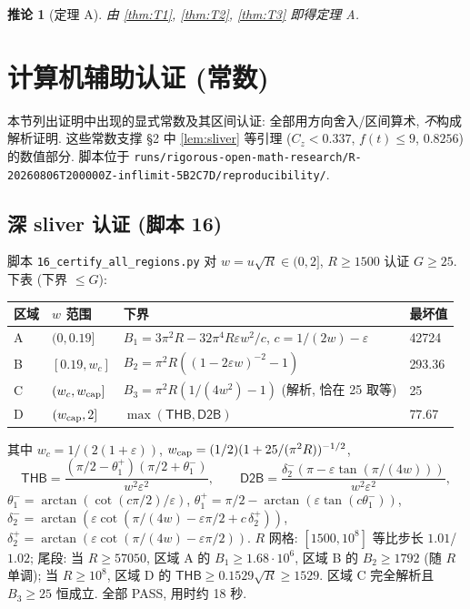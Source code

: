 \documentclass[UTF8]{ctexart}
\newtheorem{corollary}[theorem]{推论}
\begin{document}
\begin{corollary}[定理 A]
由 \ref{thm:T1}, \ref{thm:T2}, \ref{thm:T3} 即得定理 A.
\end{corollary}

\section{计算机辅助认证 (常数)}\label{sec:cac}

本节列出证明中出现的显式常数及其区间认证: 全部用方向舍入/区间算术,
\emph{不}构成解析证明. 这些常数支撑 §2 中 \ref{lem:sliver} 等引理
($C_z<0.337$, $f(t)\le9$, $0.8256$) 的数值部分.
脚本位于 \texttt{runs/rigorous-open-math-research/R-20260806T200000Z-inflimit-5B2C7D/reproducibility/}.

\subsection{深 sliver 认证 (脚本 16)}\label{sec:ca-sliver}
脚本 \texttt{16\_certify\_all\_regions.py} 对 $w=u\sqrt R\in(0,2]$, $R\ge1500$ 认证
$G\ge25$. 下表 (下界 $\le G$):
\begin{center}
\small
\begin{tabular}{@{}llll@{}}
\toprule
区域 & $w$ 范围 & 下界 & 最坏值 \\
\midrule
A & $(0,0.19]$ & $B_1=3\pi^2R-32\pi^4R\varepsilon w^2/c$, $c=1/(2w)-\varepsilon$ & 42724 \\
B & $[0.19,w_c]$ & $B_2=\pi^2R((1-2\varepsilon w)^{-2}-1)$ & 293.36 \\
C & $(w_c,w_{\rm cap}]$ & $B_3=\pi^2R(1/(4w^2)-1)$ (解析, 恰在 25 取等) & 25 \\
D & $(w_{\rm cap},2]$ & $\max(\mathsf{THB},\mathsf{D2B})$ & 77.67 \\
\bottomrule
\end{tabular}
\end{center}
其中 $w_c=1/(2(1+\varepsilon))$, $w_{\rm cap}=(1/2)(1+25/(\pi^2R))^{-1/2}$,
\begin{equation}
	\mathsf{THB}=\frac{(\pi/2-\theta_1^+)(\pi/2+\theta_1^-)}{w^2\varepsilon^2},
	\qquad
	\mathsf{D2B}=\frac{\delta_2^-(\pi-\varepsilon\tan(\pi/(4w)))}{w^2\varepsilon^2},
\end{equation}
$\theta_1^-=\arctan(\cot(c\pi/2)/\varepsilon)$, $\theta_1^+=\pi/2-\arctan(\varepsilon\tan(c\theta_1^-))$,
$\delta_2^-=\arctan(\varepsilon\cot(\pi/(4w)-\varepsilon\pi/2+c\,\delta_2^+))$,
$\delta_2^+=\arctan(\varepsilon\cot(\pi/(4w)-\varepsilon\pi/2))$.
$R$ 网格: $[1500,10^8]$ 等比步长 $1.01$/$1.02$; 尾段: 当 $R\ge57050$,
区域 A 的 $B_1\ge1.68\cdot10^6$, 区域 B 的 $B_2\ge1792$ (随 $R$ 单调);
当 $R\ge10^8$, 区域 D 的 $\mathsf{THB}\ge0.1529\sqrt R\ge1529$.
区域 C 完全解析且 $B_3\ge25$ 恒成立. 全部 PASS, 用时约 18 秒.
\end{document}
